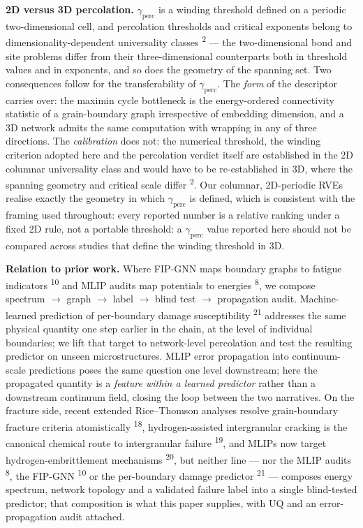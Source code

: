 \documentclass[11pt]{article}
\begin{document}
\textbf{2D versus 3D percolation.} $\gamma_{\mathrm{perc}}$ is a winding threshold defined on a periodic two-dimensional cell, and percolation thresholds and critical exponents belong to dimensionality-dependent universality classes \textsuperscript{2} --- the two-dimensional bond and site problems differ from their three-dimensional counterparts both in threshold values and in exponents, and so does the geometry of the spanning set. Two consequences follow for the transferability of $\gamma_{\mathrm{perc}}$. The \textit{form} of the descriptor carries over: the maximin cycle bottleneck is the energy-ordered connectivity statistic of a grain-boundary graph irrespective of embedding dimension, and a 3D network admits the same computation with wrapping in any of three directions. The \textit{calibration} does not: the numerical threshold, the winding criterion adopted here and the percolation verdict itself are established in the 2D columnar universality class and would have to be re-established in 3D, where the spanning geometry and critical scale differ \textsuperscript{2}. Our columnar, 2D-periodic RVEs realise exactly the geometry in which $\gamma_{\mathrm{perc}}$ is defined, which is consistent with the framing used throughout: every reported number is a relative ranking under a fixed 2D rule, not a portable threshold: a $\gamma_{\mathrm{perc}}$ value reported here should not be compared across studies that define the winding threshold in 3D.

\textbf{Relation to prior work.} Where FIP-GNN maps boundary graphs to fatigue indicators \textsuperscript{10} and MLIP audits map potentials to energies \textsuperscript{8}, we compose spectrum $\rightarrow$ graph $\rightarrow$ label $\rightarrow$ blind test $\rightarrow$ propagation audit. Machine-learned prediction of per-boundary damage susceptibility \textsuperscript{21} addresses the same physical quantity one step earlier in the chain, at the level of individual boundaries; we lift that target to network-level percolation and test the resulting predictor on unseen microstructures. MLIP error propagation into continuum-scale predictions poses the same question one level downstream; here the propagated quantity is a \textit{feature within a learned predictor} rather than a downstream continuum field, closing the loop between the two narratives. On the fracture side, recent extended Rice--Thomson analyses resolve grain-boundary fracture criteria atomistically \textsuperscript{18}, hydrogen-assisted intergranular cracking is the canonical chemical route to intergranular failure \textsuperscript{19}, and MLIPs now target hydrogen-embrittlement mechanisms \textsuperscript{20}, but neither line --- nor the MLIP audits \textsuperscript{8}, the FIP-GNN \textsuperscript{10} or the per-boundary damage predictor \textsuperscript{21} --- composes energy spectrum, network topology and a validated failure label into a single blind-tested predictor; that composition is what this paper supplies, with UQ and an error-propagation audit attached.
\end{document}
